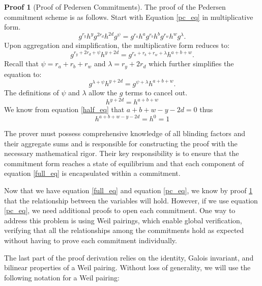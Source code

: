 \documentclass{iacrcc}
\theoremstyle{definition}
\newtheorem{namedproof}{Proof}
\begin{document}
\begin{namedproof}[Proof of Pedersen Commitments]
\label{commitment_proof}
The proof of the Pedersen commitment scheme is as follows. Start with Equation \ref{pc_eq} in multiplicative form.
\begin{equation}
g^{r_{y}} h^{y} g^{2 r_{d}} h^{2 d} g^{\psi} = g^{r_{a}} h^{a} g^{r_{b}} h^{b} g^{r_{w}} h^{w} g^{\lambda}.
\end{equation}
Upon aggregation and simplification, the multiplicative form reduces to:
\begin{equation}
\label{full_form}
g^{r_{y} + 2 r_{d} + \psi} h^{y + 2 d}  = g^{r_{a} + r_{b} + r_{w} + \lambda}  h^{a + b + w}.
\end{equation}
Recall that \( \psi = r_{a} + r_{b} + r_{w} \) and \( \lambda = r_{y} + 2r_{d} \) which further simplifies the equation to:
\begin{equation}
g^{\lambda + \psi} h^{y + 2 d}  = g^{\psi + \lambda}  h^{a + b + w}.
\end{equation}
The definitions of \( \psi \) and \( \lambda \) allow the \( g \) terms to cancel out.
\begin{equation}
h^{y + 2 d} = h^{a + b + w}
\end{equation}
We know from equation \ref{half_eq} that $a + b + w - y - 2d = 0$ thus
\begin{equation}
h^{a + b + w - y - 2 d} = h^{0} = 1
\end{equation}
\end{namedproof}

The prover must possess comprehensive knowledge of all blinding factors and their aggregate sums and is responsible for constructing the proof with the necessary mathematical rigor. Their key responsibility is to ensure that the commitment form reaches a state of equilibrium and that each component of equation \ref{full_eq} is encapsulated within a commitment.

Now that we have equation \ref{full_eq} and equation \ref{pc_eq}, we know by proof \ref{commitment_proof} that the relationship between the variables will hold. However, if we use equation \ref{pc_eq}, we need additional proofs to open each commitment. One way to address this problem is using Weil pairings, which enable global verification, verifying that all the relationships among the commitments hold as expected without having to prove each commitment individually.

The last part of the proof derivation relies on the identity, Galois invariant, and bilinear properties of a Weil pairing. Without loss of generality, we will use the following notation for a Weil pairing:
\end{document}
